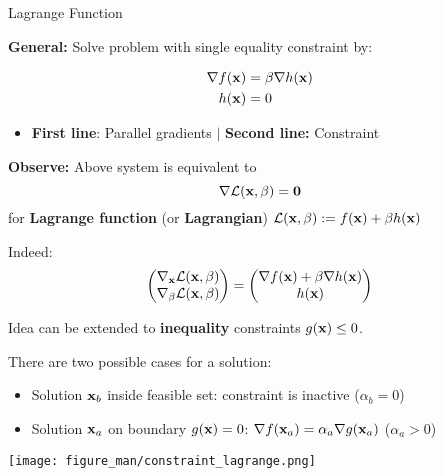 \documentclass[11pt,compress,t,notes=noshow, xcolor=table]{beamer}
\begin{document}
\begin{vbframe}{Lagrange Function}

\textbf{General:} Solve problem with single equality constraint by:

\vspace{-\baselineskip}

\begin{align*}
    \nabla f(\mathbf{x}) &= \beta \nabla h(\mathbf{x}) \\
    h(\mathbf{x}) &= 0
\end{align*}

\begin{itemize}
    \item \textbf{First line}: Parallel gradients $|$ \textbf{Second line:} Constraint
\end{itemize}

\textbf{Observe:} Above system is equivalent to
\begin{equation*}
    \nabla \mathcal{L}(\mathbf{x}, \beta) = \mathbf{0}
\end{equation*}
for \textbf{Lagrange function} (or \textbf{Lagrangian}) $\mathcal{L}(\mathbf{x}, \beta) := f(\mathbf{x}) + \beta h(\mathbf{x})$

\medskip

Indeed:
\begin{equation*}
    \begin{pmatrix}
        \nabla_{\mathbf{x}} \mathcal{L}(\mathbf{x}, \beta) \\
        \nabla_\beta \mathcal{L}(\mathbf{x}, \beta)
    \end{pmatrix}
    = \begin{pmatrix}
        \nabla f(\mathbf{x}) + \beta \nabla h(\mathbf{x}) \\
        h(\mathbf{x})
    \end{pmatrix}
\end{equation*}

\framebreak

Idea can be extended to \textbf{inequality} constraints $g(\mathbf{x}) \leq 0$.

\medskip

There are two possible cases for a solution: 

\begin{itemize}
	\item Solution $\mathbf{x}_b$ inside feasible set: constraint is inactive ($\alpha_b =0$)
	\item Solution $\mathbf{x}_a$ on boundary $g(\mathbf{x}) = 0$: $\nabla f(\mathbf{x}_a) = \alpha_a \nabla g(\mathbf{x}_a)$ ($\alpha_a > 0$)
\end{itemize}

\begin{center}
	\texttt{[image: figure\_man/constraint\_lagrange.png]}
\end{center}
\end{vbframe}
\end{document}
